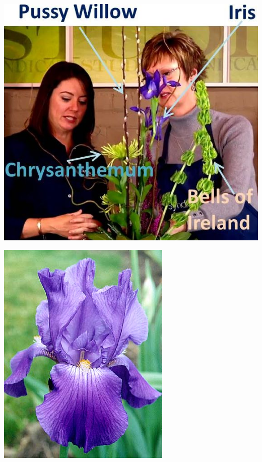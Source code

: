 \documentclass{article}
\begin{document}
\begin{center}
\includegraphics[width=0.9\textheight, angle=90]{../Iris-PussyWillow-Mum_BellsIreland.jpg}
\end{center}
\newpage

\begin{center}
\includegraphics[width=0.9\textheight, angle=90]{../Iris_Chivalry.jpg}
\end{center}
\newpage
\end{document}
